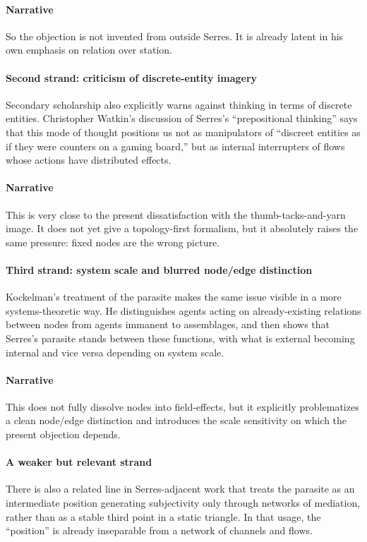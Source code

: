 \paragraph{Narrative}
So the objection is not invented from outside Serres.
It is already latent in his own emphasis on relation over station.

\paragraph{Second strand: criticism of discrete-entity imagery}
Secondary scholarship also explicitly warns against thinking in terms of discrete entities.
Christopher Watkin's discussion of Serres's ``prepositional thinking'' says that this mode
of thought positions us not as manipulators of ``discreet entities as if they were counters
on a gaming board,'' but as internal interrupters of flows whose actions have distributed effects.

\paragraph{Narrative}
This is very close to the present dissatisfaction with the thumb-tacks-and-yarn image.
It does not yet give a topology-first formalism, but it absolutely raises the same pressure:
fixed nodes are the wrong picture.

\paragraph{Third strand: system scale and blurred node/edge distinction}
Kockelman's treatment of the parasite makes the same issue visible in a more systems-theoretic way.
He distinguishes agents acting on already-existing relations between nodes from agents immanent
to assemblages, and then shows that Serres's parasite stands between these functions,
with what is external becoming internal and vice versa depending on system scale.

\paragraph{Narrative}
This does not fully dissolve nodes into field-effects, but it explicitly problematizes
a clean node/edge distinction and introduces the scale sensitivity on which the present objection depends.

\paragraph{A weaker but relevant strand}
There is also a related line in Serres-adjacent work that treats the parasite as an intermediate
position generating subjectivity only through networks of mediation, rather than as a stable third
point in a static triangle. In that usage, the ``position'' is already inseparable from a network
of channels and flows.

